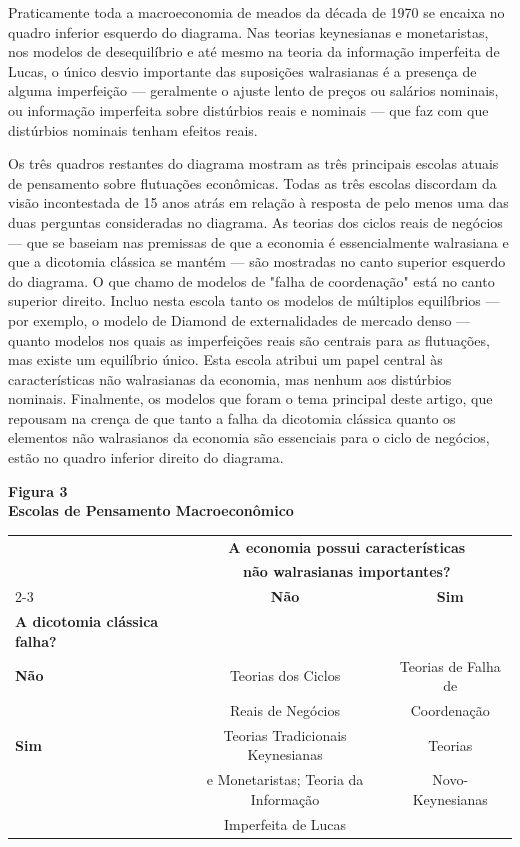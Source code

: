 \documentclass[12pt]{article}
\begin{document}
{Praticamente toda a macroeconomia de meados da década de 1970 se encaixa no quadro inferior esquerdo do diagrama. Nas teorias keynesianas e monetaristas, nos modelos de desequilíbrio e até mesmo na teoria da informação imperfeita de Lucas, o único desvio importante das suposições walrasianas é a presença de alguma imperfeição — geralmente o ajuste lento de preços ou salários nominais, ou informação imperfeita sobre distúrbios reais e nominais — que faz com que distúrbios nominais tenham efeitos reais.

Os três quadros restantes do diagrama mostram as três principais escolas atuais de pensamento sobre flutuações econômicas. Todas as três escolas discordam da visão incontestada de 15 anos atrás em relação à resposta de pelo menos uma das duas perguntas consideradas no diagrama. As teorias dos ciclos reais de negócios — que se baseiam nas premissas de que a economia é essencialmente walrasiana e que a dicotomia clássica se mantém — são mostradas no canto superior esquerdo do diagrama. O que chamo de modelos de "falha de coordenação" está no canto superior direito. Incluo nesta escola tanto os modelos de múltiplos equilíbrios — por exemplo, o modelo de Diamond de externalidades de mercado denso — quanto modelos nos quais as imperfeições reais são centrais para as flutuações, mas existe um equilíbrio único. Esta escola atribui um papel central às características não walrasianas da economia, mas nenhum aos distúrbios nominais. Finalmente, os modelos que foram o tema principal deste artigo, que repousam na crença de que tanto a falha da dicotomia clássica quanto os elementos não walrasianos da economia são essenciais para o ciclo de negócios, estão no quadro inferior direito do diagrama.

\begin{center}
\textbf{Figura 3} \\
\textbf{Escolas de Pensamento Macroeconômico} \\
\begin{tabular}{|l|c|c|}
\hline
& \multicolumn{2}{c|}{\textbf{A economia possui características}} \\
& \multicolumn{2}{c|}{\textbf{não walrasianas importantes?}} \\
\cline{2-3}
& \textbf{Não} & \textbf{Sim} \\
\hline
\textbf{A dicotomia clássica falha?} & & \\
\textbf{Não} & Teorias dos Ciclos & Teorias de Falha de \\
& Reais de Negócios & Coordenação \\
\hline
\textbf{Sim} & Teorias Tradicionais Keynesianas & Teorias \\
& e Monetaristas; Teoria da Informação & Novo-Keynesianas \\
& Imperfeita de Lucas & \\
\hline
\end{tabular}
\end{center}

}
\end{document}
